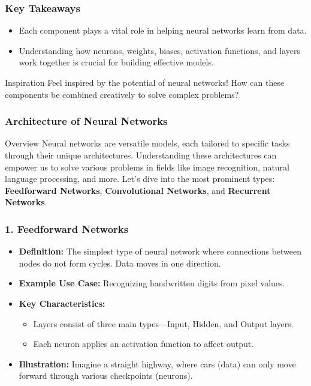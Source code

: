 \documentclass[aspectratio=169]{beamer}
\begin{document}
\begin{frame}[fragile]
    \frametitle{Key Takeaways}
    
    \begin{itemize}
        \item Each component plays a vital role in helping neural networks learn from data.
        \item Understanding how neurons, weights, biases, activation functions, and layers work together is crucial for building effective models.
    \end{itemize}
    
    \begin{block}{Inspiration}
        Feel inspired by the potential of neural networks! How can these components be combined creatively to solve complex problems?
    \end{block}
\end{frame}

\begin{frame}[fragile]
    \frametitle{Architecture of Neural Networks}
    \begin{block}{Overview}
        Neural networks are versatile models, each tailored to specific tasks through their unique architectures. 
        Understanding these architectures can empower us to solve various problems in fields like image recognition, natural language processing, and more.
        Let's dive into the most prominent types: \textbf{Feedforward Networks}, \textbf{Convolutional Networks}, and \textbf{Recurrent Networks}.
    \end{block}
\end{frame}

\begin{frame}[fragile]
    \frametitle{1. Feedforward Networks}
    \begin{itemize}
        \item \textbf{Definition:} The simplest type of neural network where connections between nodes do not form cycles. Data moves in one direction.
        \item \textbf{Example Use Case:} Recognizing handwritten digits from pixel values.
        \item \textbf{Key Characteristics:}
        \begin{itemize}
            \item Layers consist of three main types—Input, Hidden, and Output layers.
            \item Each neuron applies an activation function to affect output.
        \end{itemize}
        \item \textbf{Illustration:} Imagine a straight highway, where cars (data) can only move forward through various checkpoints (neurons).
    \end{itemize}
\end{frame}
\end{document}
